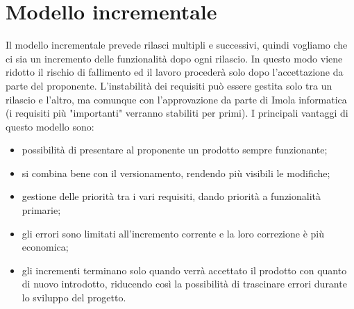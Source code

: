 \section{Modello incrementale}
Il modello incrementale prevede rilasci multipli e successivi, quindi vogliamo che ci sia un incremento delle funzionalità dopo ogni rilascio. In questo modo viene ridotto il rischio di fallimento ed il lavoro procederà solo dopo l’accettazione da parte del proponente. L'instabilità dei requisiti può essere gestita solo tra un rilascio e l'altro, ma comunque con l’approvazione da parte di Imola informatica (i requisiti più "importanti" verranno stabiliti per primi). I principali vantaggi di questo modello sono:
\begin{itemize}
    \item possibilità di presentare al proponente un prodotto sempre funzionante;
    \item si combina bene con il versionamento, rendendo più visibili le modifiche;
    \item gestione delle priorità tra i vari requisiti, dando priorità a funzionalità primarie;
    \item gli errori sono limitati all’incremento corrente e la loro correzione è più economica;
    \item gli incrementi terminano solo quando verrà accettato il prodotto con quanto di nuovo introdotto, riducendo così la possibilità di trascinare errori durante lo sviluppo del progetto.
\end{itemize}